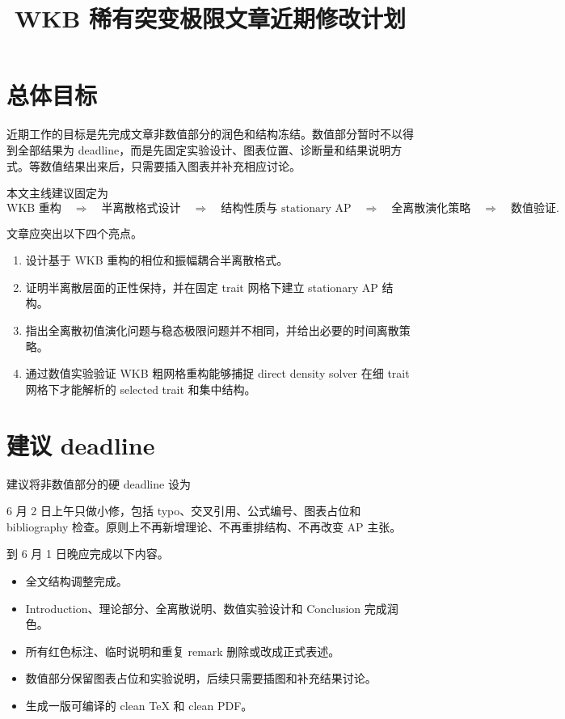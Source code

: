 \documentclass[11pt,a4paper]{ctexart}
\title{WKB 稀有突变极限文章近期修改计划}
\author{}
\date{}
\begin{document}
\maketitle

\section{总体目标}

近期工作的目标是先完成文章非数值部分的润色和结构冻结。数值部分暂时不以得到全部结果为 deadline，而是先固定实验设计、图表位置、诊断量和结果说明方式。等数值结果出来后，只需要插入图表并补充相应讨论。

本文主线建议固定为
\begin{equation*}
\text{WKB 重构}
\quad \Longrightarrow \quad
\text{半离散格式设计}
\quad \Longrightarrow \quad
\text{结构性质与 stationary AP}
\quad \Longrightarrow \quad
\text{全离散演化策略}
\quad \Longrightarrow \quad
\text{数值验证}.
\end{equation*}

文章应突出以下四个亮点。
\begin{enumerate}
    \item 设计基于 WKB 重构的相位和振幅耦合半离散格式。
    \item 证明半离散层面的正性保持，并在固定 trait 网格下建立 stationary AP 结构。
    \item 指出全离散初值演化问题与稳态极限问题并不相同，并给出必要的时间离散策略。
    \item 通过数值实验验证 WKB 粗网格重构能够捕捉 direct density solver 在细 trait 网格下才能解析的 selected trait 和集中结构。
\end{enumerate}

\section{建议 deadline}

建议将非数值部分的硬 deadline 设为
\begin{center}
\end{center}

6 月 2 日上午只做小修，包括 typo、交叉引用、公式编号、图表占位和 bibliography 检查。原则上不再新增理论、不再重排结构、不再改变 AP 主张。

到 6 月 1 日晚应完成以下内容。
\begin{itemize}
    \item 全文结构调整完成。
    \item Introduction、理论部分、全离散说明、数值实验设计和 Conclusion 完成润色。
    \item 所有红色标注、临时说明和重复 remark 删除或改成正式表述。
    \item 数值部分保留图表占位和实验说明，后续只需要插图和补充结果讨论。
    \item 生成一版可编译的 clean TeX 和 clean PDF。
\end{itemize}
\end{document}
